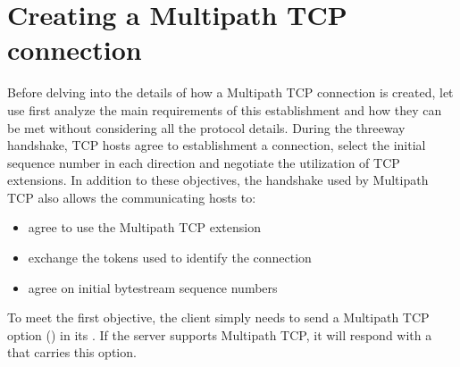 \documentclass[letterpaper,10pt,english]{sphinxmanual}
\begin{document}
\section{Creating a Multipath TCP connection}
\label{\detokenize{mptcp:creating-a-multipath-tcp-connection}}\label{\detokenize{mptcp:mptcp-initial-handshake}}
\sphinxAtStartPar
Before delving into the details of how a Multipath TCP connection is created, let use first analyze the main requirements of this establishment and how they can be met without considering all the protocol details. During the three\sphinxhyphen{}way handshake, TCP hosts agree to establishment a connection, select the initial sequence number in each direction and negotiate the utilization of TCP extensions. In addition to these objectives, the handshake used by Multipath TCP also allows the communicating hosts to:
\begin{itemize}
\item {} 
\sphinxAtStartPar
agree to use the Multipath TCP extension

\item {} 
\sphinxAtStartPar
exchange the tokens used to identify the connection

\item {} 
\sphinxAtStartPar
agree on initial bytestream sequence numbers

\end{itemize}

\sphinxAtStartPar
To meet the first objective, the client simply needs to send a Multipath TCP option () in its . If the server supports Multipath TCP, it will respond with a  that carries this option.
\end{document}
